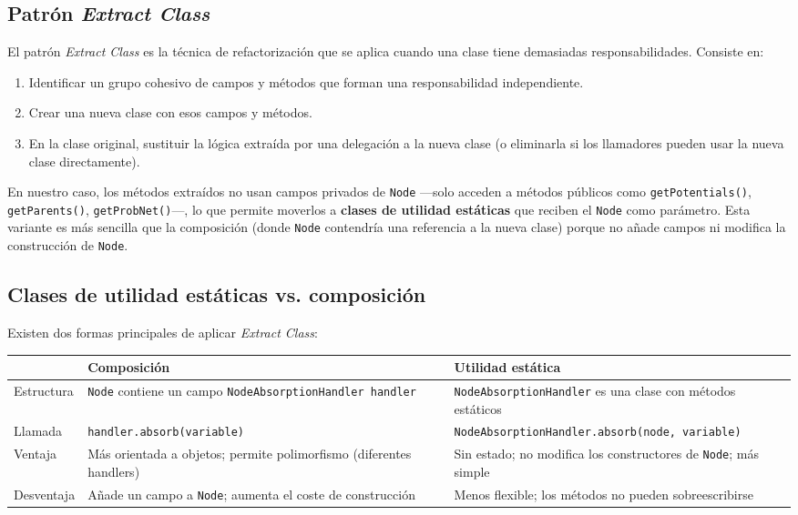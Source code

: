 \documentclass[11pt,a4paper]{article}
\newcommand{\code}[1]{\texttt{#1}}
\begin{document}
\subsection{Patr\'on \emph{Extract Class}}

El patr\'on \emph{Extract Class} \cite{fowler2019} es la t\'ecnica de
refactorizaci\'on que se aplica cuando una clase tiene demasiadas
responsabilidades.  Consiste en:

\begin{enumerate}
  \item Identificar un grupo cohesivo de campos y m\'etodos que forman
        una responsabilidad independiente.
  \item Crear una nueva clase con esos campos y m\'etodos.
  \item En la clase original, sustituir la l\'ogica extra\'ida por una
        delegaci\'on a la nueva clase (o eliminarla si los llamadores
        pueden usar la nueva clase directamente).
\end{enumerate}

En nuestro caso, los m\'etodos extra\'idos no usan campos privados de
\code{Node} ---solo acceden a m\'etodos p\'ublicos como
\code{getPotentials()}, \code{getParents()}, \code{getProbNet()}---,
lo que permite moverlos a \textbf{clases de utilidad est\'aticas} que
reciben el \code{Node} como par\'ametro.  Esta variante es m\'as
sencilla que la composici\'on (donde \code{Node} contendr\'ia una
referencia a la nueva clase) porque no a\~nade campos ni modifica la
construcci\'on de \code{Node}.

\subsection{Clases de utilidad est\'aticas vs. composici\'on}

Existen dos formas principales de aplicar \emph{Extract Class}:

\begin{center}
\begin{tabular}{lp{5cm}p{5cm}}
\toprule
& \textbf{Composici\'on} & \textbf{Utilidad est\'atica} \\
\midrule
Estructura &
  \code{Node} contiene un campo
  \code{NodeAbsorptionHandler handler} &
  \code{NodeAbsorptionHandler} es una clase
  con m\'etodos est\'aticos \\
\addlinespace
Llamada &
  \code{handler.absorb(variable)} &
  \code{NodeAbsorptionHandler.absorb(node, variable)} \\
\addlinespace
Ventaja &
  M\'as orientada a objetos; permite
  polimorfismo (diferentes handlers) &
  Sin estado; no modifica los constructores
  de \code{Node}; m\'as simple \\
\addlinespace
Desventaja &
  A\~nade un campo a \code{Node};
  aumenta el coste de construcci\'on &
  Menos flexible; los m\'etodos no pueden
  sobreescribirse \\
\bottomrule
\end{tabular}
\end{center}
\end{document}
